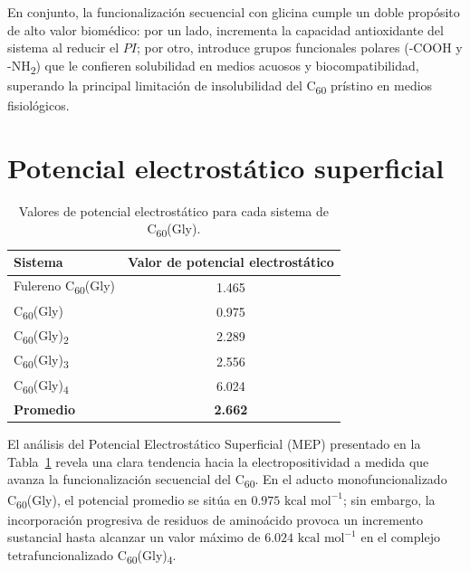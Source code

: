 En conjunto, la funcionalización secuencial con glicina cumple un doble propósito de alto valor biomédico: por un lado, incrementa la capacidad antioxidante del sistema al reducir el $PI$; por otro, introduce grupos funcionales polares (-COOH y -NH\textsubscript{2}) que le confieren solubilidad en medios acuosos y biocompatibilidad, superando la principal limitación de insolubilidad del C\textsubscript{60} prístino en medios fisiológicos.


    
    \section{Potencial electrostático superficial}
     \begin{table}[H]
    \centering
    \caption{Valores de potencial electrostático para cada sistema de C\textsubscript{60}(Gly).}
    \label{tab:potencial-electrostatico}
    \renewcommand{\arraystretch}{1.15}
    \begin{tabular}{lc}
        \toprule
        \textbf{Sistema} & \textbf{Valor de potencial electrostático} \\
        \midrule
        Fulereno C\textsubscript{60}(Gly) & 1.465 \\
       C\textsubscript{60}(Gly) & 0.975 \\
        C\textsubscript{60}(Gly)\textsubscript{2} & 2.289 \\
        C\textsubscript{60}(Gly)\textsubscript{3} & 2.556 \\
        C\textsubscript{60}(Gly)\textsubscript{4} & 6.024 \\
        \midrule
        \textbf{Promedio} & \textbf{2.662} \\
        \bottomrule
        \end{tabular}
\end{table}

El análisis del Potencial Electrostático Superficial (MEP) presentado en la Tabla~\ref{tab:potencial-electrostatico} revela una clara tendencia hacia la electropositividad a medida que avanza la funcionalización secuencial del C\textsubscript{60}. En el aducto monofuncionalizado C\textsubscript{60}(Gly), el potencial promedio se sitúa en $0.975\text{ kcal mol}^{-1}$; sin embargo, la incorporación progresiva de residuos de aminoácido provoca un incremento sustancial hasta alcanzar un valor máximo de $6.024\text{ kcal mol}^{-1}$ en el complejo tetrafuncionalizado C\textsubscript{60}(Gly)\textsubscript{4}. 

